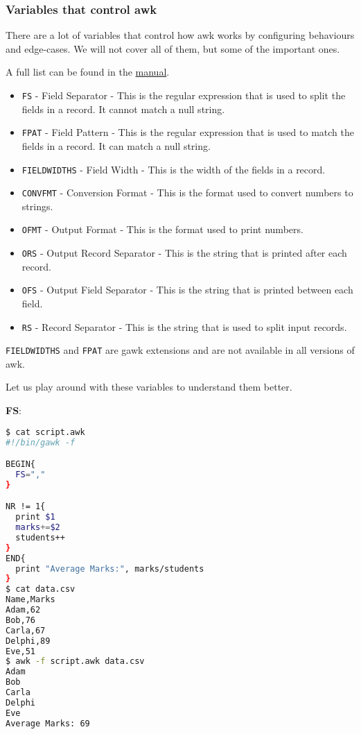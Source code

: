 \subsubsection{Variables that control awk}

There are a lot of variables that control how awk works by configuring behaviours and edge-cases. We will not cover all of them, but some of the important ones.

A full list can be found in the
\href{https://www.gnu.org/software/gawk/manual/html\_node/User_002dmodified.html}{manual}.

\begin{itemize}
\item \lstinline|FS| - Field Separator - This is the regular expression that is used to split the fields in a record. It cannot match a null string.
\item \lstinline|FPAT| - Field Pattern - This is the regular expression that is used to match the fields in a record. It can match a null string.
\item \lstinline|FIELDWIDTHS| - Field Width - This is the width of the fields in a record.
\item \lstinline|CONVFMT| - Conversion Format - This is the format used to convert numbers to strings.
\item \lstinline|OFMT| - Output Format - This is the format used to print numbers.
\item \lstinline|ORS| - Output Record Separator - This is the string that is printed after each record.
\item \lstinline|OFS| - Output Field Separator - This is the string that is printed between each field.
\item \lstinline|RS| - Record Separator - This is the string that is used to split input records.
\end{itemize}

\lstinline|FIELDWIDTHS| and \lstinline|FPAT| are gawk extensions and are not available in all versions of awk.

Let us play around with these variables to understand them better.

\textbf{FS}:

\begin{lstlisting}[language=bash]
$ cat script.awk
#!/bin/gawk -f

BEGIN{
  FS=","
}

NR != 1{
  print $1
  marks+=$2
  students++
}
END{
  print "Average Marks:", marks/students
}
$ cat data.csv
Name,Marks
Adam,62
Bob,76
Carla,67
Delphi,89
Eve,51
$ awk -f script.awk data.csv
Adam
Bob
Carla
Delphi
Eve
Average Marks: 69
\end{lstlisting}

